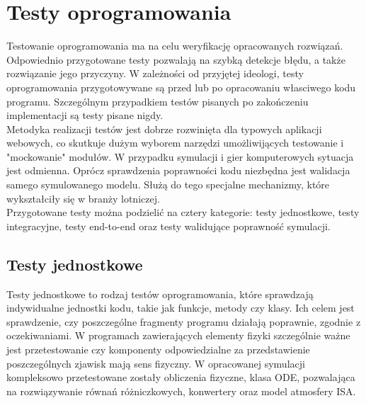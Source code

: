 \documentclass[15pt]{sprawozdanie}
\begin{document}
\begin{table}[!h]
\caption{Analiza SWOT}
\label{swot}
\end{table}

\newpage
\section{Testy oprogramowania}

Testowanie oprogramowania ma na celu weryfikację opracowanych rozwiązań. Odpowiednio przygotowane testy pozwalają na szybką detekcje błędu, a także rozwiązanie jego przyczyny. W zależności od przyjętej ideologi, testy oprogramowania przygotowywane są przed lub po opracowaniu własciwego kodu programu. Szczególnym przypadkiem testów pisanych po zakończeniu implementacji są testy pisane nigdy.\\

Metodyka realizacji testów jest dobrze rozwinięta dla typowych aplikacji webowych, co skutkuje dużym wyborem narzędzi umożliwijących testowanie i "mockowanie" modułów. W przypadku symulacji i gier komputerowych sytuacja jest odmienna. Oprócz sprawdzenia poprawności kodu niezbędna jest walidacja samego symulowanego modelu. Służą do tego specjalne mechanizmy, które wykształciły się w branży lotniczej.\\

Przygotowane testy można podzielić na cztery kategorie: testy jednostkowe, testy integracyjne, testy end-to-end oraz testy walidujące poprawność symulacji.

\subsection{Testy jednostkowe}

Testy jednostkowe to rodzaj testów oprogramowania, które sprawdzają indywidualne jednostki kodu, takie jak funkcje, metody czy klasy. Ich celem jest sprawdzenie, czy poszczególne fragmenty programu działają poprawnie, zgodnie z oczekiwaniami.
W programach zawierających elementy fizyki szczególnie ważne jest przetestowanie czy komponenty odpowiedzialne za przedstawienie poszczególnych zjawisk mają sens fizyczny.
W opracowanej symulacji kompleksowo przetestowane zostały obliczenia fizyczne, klasa ODE, pozwalająca na rozwiązywanie równań różniczkowych, konwertery oraz model atmosfery ISA. 
\end{document}

